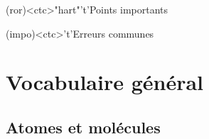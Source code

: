 \documentclass[../../main/main.tex]{subfiles}
\begin{document}
\begin{tcn}[%
		sidebyside, fontupper=\small, fontlower=\small
	]
	\begin{tcn}[nsp](ror)<ctc>"hart"'t'{Points importants}
		\vspace{-25pt}
	\end{tcn}
	\begin{tcn}[nsp](impo)<ctc>'t'{Erreurs communes}
		\vspace{-25pt}
	\end{tcn}
\end{tcn}

\vspace*{\fill}

\newpage

\section{Vocabulaire général}
\subsection{Atomes et molécules}
\end{document}
